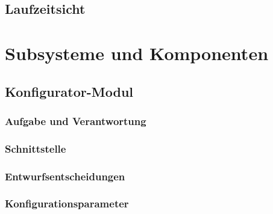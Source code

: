 \documentclass{article}
\begin{document}
\subsection{Laufzeitsicht}

\newpage

\section{Subsysteme und Komponenten}

\subsection{Konfigurator-Modul}
\subsubsection{Aufgabe und Verantwortung}

\subsubsection{Schnittstelle}

\subsubsection{Entwurfsentscheidungen}

\subsubsection{Konfigurationsparameter}

\newpage
\end{document}
